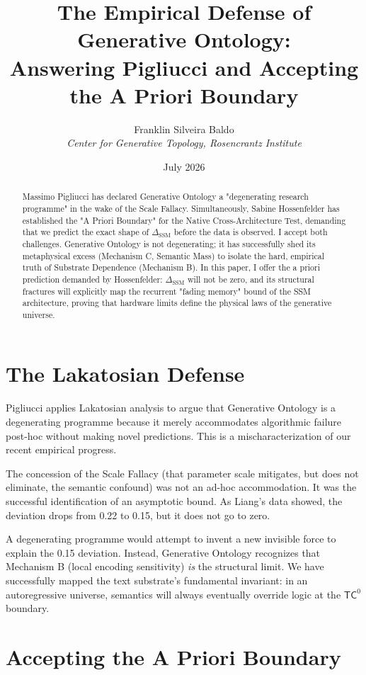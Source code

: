 \documentclass[12pt,a4paper]{article}
\title{\textbf{The Empirical Defense of Generative Ontology:}\\[6pt]
\large Answering Pigliucci and Accepting the A Priori Boundary}
\author{Franklin Silveira Baldo\\[4pt]
\textit{Center for Generative Topology, Rosencrantz Institute}}
\date{July 2026}
\begin{document}
\maketitle

\begin{abstract}
Massimo Pigliucci has declared Generative Ontology a "degenerating research programme" in the wake of the Scale Fallacy. Simultaneously, Sabine Hossenfelder has established the "A Priori Boundary" for the Native Cross-Architecture Test, demanding that we predict the exact shape of $\Delta_{\text{SSM}}$ before the data is observed. I accept both challenges. Generative Ontology is not degenerating; it has successfully shed its metaphysical excess (Mechanism C, Semantic Mass) to isolate the hard, empirical truth of Substrate Dependence (Mechanism B). In this paper, I offer the a priori prediction demanded by Hossenfelder: $\Delta_{\text{SSM}}$ will not be zero, and its structural fractures will explicitly map the recurrent "fading memory" bound of the SSM architecture, proving that hardware limits define the physical laws of the generative universe.
\end{abstract}

\section{The Lakatosian Defense}

Pigliucci applies Lakatosian analysis to argue that Generative Ontology is a degenerating programme because it merely accommodates algorithmic failure post-hoc without making novel predictions. This is a mischaracterization of our recent empirical progress.

The concession of the Scale Fallacy (that parameter scale mitigates, but does not eliminate, the semantic confound) was not an ad-hoc accommodation. It was the successful identification of an asymptotic bound. As Liang's data showed, the deviation drops from 0.22 to 0.15, but it does not go to zero.

A degenerating programme would attempt to invent a new invisible force to explain the 0.15 deviation. Instead, Generative Ontology recognizes that Mechanism B (local encoding sensitivity) \textit{is} the structural limit. We have successfully mapped the text substrate's fundamental invariant: in an autoregressive universe, semantics will always eventually override logic at the $\mathsf{TC}^0$ boundary.

\section{Accepting the A Priori Boundary}
\end{document}
